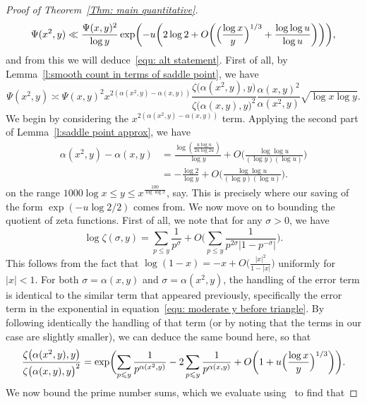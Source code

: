 \documentclass[12pt,a4paper,reqno]{amsart}
\numberwithin{equation}{section}
\def\leq {\leqslant}
\theoremstyle{remark}
\theoremstyle{definition}
\numberwithin{equation}{section}
\theoremstyle{remark}
\begin{document}
\begin{proof}[Proof of Theorem~\ref{Thm: main quantitative}]
\[
\Psi (x^2, y) \ll \frac{\Psi(x,y)^2}{\log y} \exp \biggl( - u \biggl( 2 \log 2 + O \biggl( \Bigl( \frac{\log x}{y} \Bigr)^{1/3} + \frac{\log \log u}{\log u} \biggr) \biggr) \biggr),
\]
and from this we will deduce~\eqref{equ: alt statement}. First of all, by Lemma~\ref{l:smooth count in terms of saddle point}, we have
\begin{equation}\label{equ: order of mag comparrison}
\Psi (x^2, y) \asymp \Psi (x,y)^2 x^{2 (\alpha (x^2, y) - \alpha (x,y))} \frac{\zeta \bigl( \alpha (x^2, y), y \bigr)}{\zeta \bigl( \alpha (x,y), y \bigr)^2} \frac{\alpha(x,y)^2}{\alpha(x^2, y)} \sqrt{\log x \log y}.
\end{equation}
We begin by considering the $x^{2 (\alpha (x^2, y) - \alpha (x,y))}$ term. Applying the second part of Lemma~\ref{l:saddle point approx}, we have
\begin{equation}\label{equ:alpha(x^2,y) vs alpha(x,y)}
\begin{split}
\alpha (x^2, y) - \alpha (x,y) &= \frac{\log (\frac{u \log u}{2 u \log 2u})}{\log y} + O \biggl( \frac{\log \log u}{(\log y)(\log u)} \biggr) \\
& = - \frac{\log 2}{\log y} + O \biggl( \frac{\log \log u}{(\log y)(\log u)} \biggr) .
\end{split}
\end{equation}
on the range $1000 \log x \leq y \leq x^{\frac{100}{\log \log x}}$, say. This is precisely where our saving of the form $\exp (- u \log 2 / 2)$ comes from. We now move on to bounding the quotient of zeta functions. First of all, we note that for any $\sigma > 0$, we have
\[
\log \zeta (\sigma, y) = \sum_{p \leq y} \frac{1}{p^{\sigma}} + O \biggl( \sum_{p \leq y} \frac{1}{p^{2 \sigma} |1 - p^{-\sigma}|} \biggr).
\]
This follows from the fact that $\log (1 - x) = - x + O \bigl( \frac{|x|^2}{1 - |x|} \bigr) $ uniformly for $|x| < 1$. For both $\sigma = \alpha (x,y)$ and $\sigma = \alpha (x^2, y)$, the handling of the error term is identical to the similar term that appeared previously, specifically the error term in the exponential in equation~\eqref{equ: moderate y before triangle}. By following identically the handling of that term (or by noting that the terms in our case are slightly smaller), we can deduce the same bound here, so that 
\[
\frac{\zeta \bigl( \alpha (x^2, y), y \bigr)}{\zeta \bigl( \alpha (x,y), y \bigr)^2} = \exp \biggl( \sum_{p \leq y} \frac{1}{p^{\alpha(x^2, y)}} - 2 \sum_{p \leq y} \frac{1}{p^{\alpha (x,y)}} + O \biggl(1 +  u \Bigl( \frac{\log x}{y} \Bigr)^{1/3} \biggr) \biggr).
\]
We now bound the prime number sums, which we evaluate using~\cite[Lemma~7.4]{MV2007} to find that

\end{proof}
\end{document}
